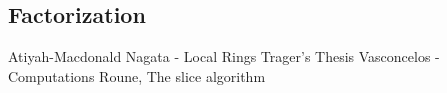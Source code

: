 \documentclass{amsart}
\theoremstyle{definition}
\begin{document}
\subsection{Factorization}



\begin{thebibliography}{2}

  Atiyah-Macdonald
  Nagata - Local Rings
  Trager's Thesis
  Vasconcelos - Computations
  Roune, The slice algorithm
\end{thebibliography}
\end{document}
